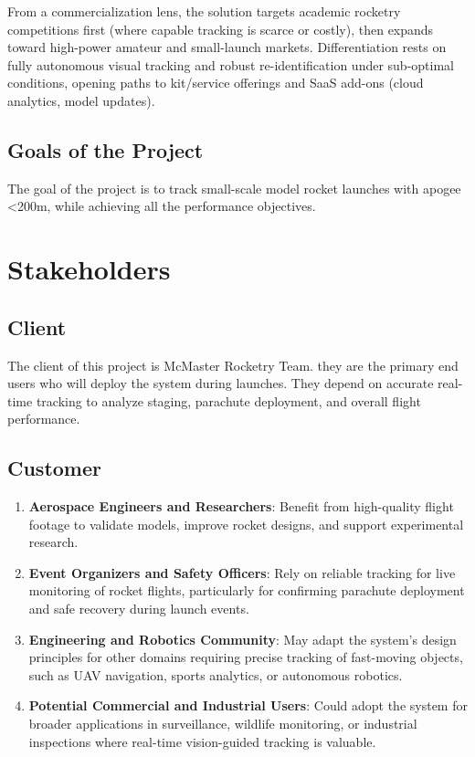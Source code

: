 \documentclass[12pt]{article}
\begin{document}
From a commercialization lens, the solution targets academic rocketry
competitions first (where capable tracking is scarce or costly), then expands
toward high-power amateur and small-launch markets. Differentiation rests on
fully autonomous visual tracking and robust re-identification under sub-optimal
conditions, opening paths to kit/service offerings and SaaS add-ons (cloud
analytics, model updates).

\subsection{Goals of the Project}

The goal of the project is to track small-scale model rocket launches with
apogee \textless 200m, while achieving all the performance objectives.

\section{Stakeholders}

\subsection{Client}

The client of this project is McMaster Rocketry Team. they are the primary end
users who will deploy the system during launches. They depend on accurate
real-time tracking to analyze staging, parachute deployment, and overall flight
performance.

\subsection{Customer}

\begin{enumerate}
  \item \textbf{Aerospace Engineers and Researchers}: Benefit from
        high-quality flight footage to validate models, improve rocket
        designs, and support experimental research.

  \item \textbf{Event Organizers and Safety Officers}: Rely on
        reliable tracking for live monitoring of rocket flights,
        particularly for confirming parachute deployment and safe
        recovery during launch events.

  \item \textbf{Engineering and Robotics Community}: May adapt the
        system's design principles for other domains requiring precise
        tracking of fast-moving objects, such as UAV navigation, sports
        analytics, or autonomous robotics.

  \item \textbf{Potential Commercial and Industrial Users}: Could
        adopt the system for broader applications in surveillance,
        wildlife monitoring, or industrial inspections where real-time
        vision-guided tracking is valuable.
\end{enumerate}
\end{document}
